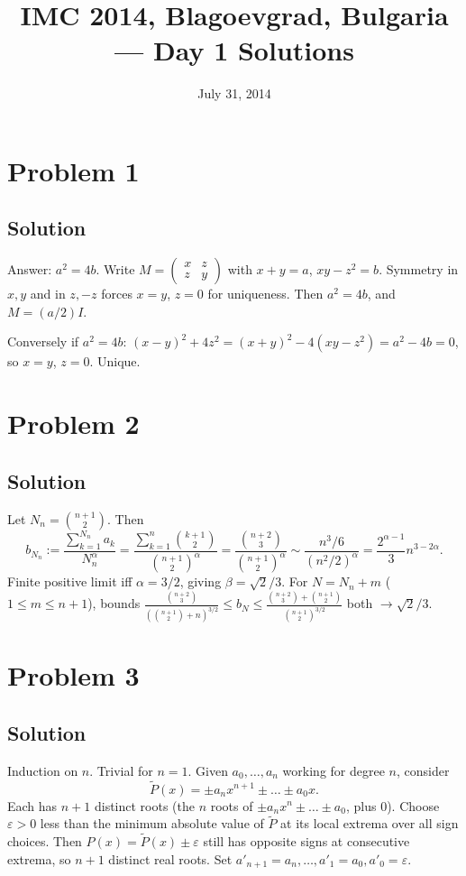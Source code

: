 \documentclass{article}
\title{IMC 2014, Blagoevgrad, Bulgaria --- Day 1 Solutions}
\date{July 31, 2014}
\begin{document}
\maketitle

\section*{Problem 1}
\subsection*{Solution}
Answer: $a^2 = 4b$. Write $M = \begin{pmatrix} x & z \\ z & y \end{pmatrix}$ with $x+y = a$, $xy - z^2 = b$. Symmetry in $x, y$ and in $z, -z$ forces $x = y$, $z = 0$ for uniqueness. Then $a^2 = 4b$, and $M = (a/2) I$.

Conversely if $a^2 = 4b$: $(x-y)^2 + 4z^2 = (x+y)^2 - 4(xy - z^2) = a^2 - 4b = 0$, so $x = y$, $z = 0$. Unique.

\section*{Problem 2}
\subsection*{Solution}
Let $N_n = \binom{n+1}{2}$. Then
\[ b_{N_n} := \frac{\sum_{k=1}^{N_n} a_k}{N_n^\alpha} = \frac{\sum_{k=1}^n \binom{k+1}{2}}{\binom{n+1}{2}^\alpha} = \frac{\binom{n+2}{3}}{\binom{n+1}{2}^\alpha} \sim \frac{n^3/6}{(n^2/2)^\alpha} = \frac{2^{\alpha-1}}{3} n^{3 - 2\alpha}. \]
Finite positive limit iff $\alpha = 3/2$, giving $\beta = \sqrt{2}/3$. For $N = N_n + m$ ($1 \le m \le n+1$), bounds $\frac{\binom{n+2}{3}}{(\binom{n+1}{2}+n)^{3/2}} \le b_N \le \frac{\binom{n+2}{3}+\binom{n+1}{2}}{\binom{n+1}{2}^{3/2}}$ both $\to \sqrt{2}/3$.

\section*{Problem 3}
\subsection*{Solution}
Induction on $n$. Trivial for $n=1$. Given $a_0, \dots, a_n$ working for degree $n$, consider
\[ \tilde{P}(x) = \pm a_n x^{n+1} \pm \dots \pm a_0 x. \]
Each has $n+1$ distinct roots (the $n$ roots of $\pm a_n x^n \pm \dots \pm a_0$, plus $0$). Choose $\varepsilon > 0$ less than the minimum absolute value of $\tilde P$ at its local extrema over all sign choices. Then $P(x) = \tilde P(x) \pm \varepsilon$ still has opposite signs at consecutive extrema, so $n+1$ distinct real roots. Set $a'_{n+1} = a_n, \dots, a'_1 = a_0, a'_0 = \varepsilon$.
\end{document}
